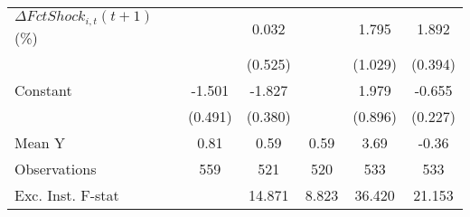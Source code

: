 {\begin{tabular}{l*{5}{c}}
\addlinespace
$ \Delta FctShock_{i,t}(t+1)$ (\%)&                     &       0.032         &                     &       1.795\sym{*}  &       1.892\sym{***}\\
                    &                     &     (0.525)         &                     &     (1.029)         &     (0.394)         \\
\addlinespace
Constant            &      -1.501\sym{***}&      -1.827\sym{***}&                     &       1.979\sym{**} &      -0.655\sym{***}\\
                    &     (0.491)         &     (0.380)         &                     &     (0.896)         &     (0.227)         \\
\midrule
Mean Y              &        0.81         &        0.59         &        0.59         &        3.69         &       -0.36         \\
Observations        &         559         &         521         &         520         &         533         &         533         \\
Exc. Inst. F-stat   &                     &      14.871         &       8.823         &      36.420         &      21.153         \\
\bottomrule
\end{tabular}
}

